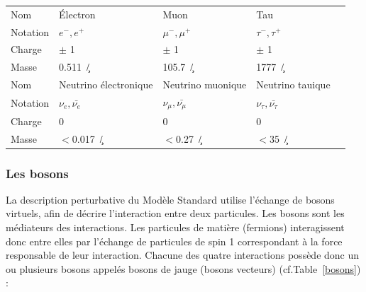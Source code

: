 \begin{table}[H]
\begin{tabular}{|O|O|O|O|N}
		\hline
		 Nom &  Électron &  Muon &  Tau \\
		 Notation &  $e^{-},e^{+}$ &  $\mu^{-},\mu^{+}$ &  $\tau^{-},\tau^{+}$ \\
		 Charge &  $\pm$ \num{1} &  $\pm$ \num{1} &  $\pm$ \num{1} \\
		 Masse &  \SI{0.511}{\mega\eV/\square\c} &  \SI{105.7}{\mega\eV/\square\c}&  \SI{1777}{\giga\eV/\square\c} \\
		\hline 
		 Nom &  Neutrino électronique &  Neutrino muonique &  Neutrino tauique \\
		 Notation &  $\nu_{e},\bar{\nu_{e}}$&  $\nu_{\mu},\bar{\nu_{\mu}}$ &  $\nu_{\tau},\bar{\nu_{\tau}}$ \\
		 Charge &  \num{0} &  \num{0} &  \num{0} \\
		 Masse &  $<$\SI{0.017}{\mega\eV/\square\c} & $<$\SI{0.27}{\mega\eV/\square\c}  & $<$\SI{35}{\mega\eV/\square\c}\\
	\hline
\end{tabular} 
\label{fermions}
\end{table}	

\subsubsection{Les bosons}
La description perturbative du Modèle Standard utilise l'échange de bosons virtuels, afin de décrire l'interaction entre deux particules. Les bosons sont les médiateurs des interactions. Les particules de matière (fermions) interagissent donc entre elles par l'échange de particules de spin \num{1} correspondant à la force responsable de leur interaction.
\smallskip
Chacune des quatre interactions possède donc un ou plusieurs bosons appelés bosons de jauge (bosons vecteurs) (cf.Table~\ref{bosons}) :

